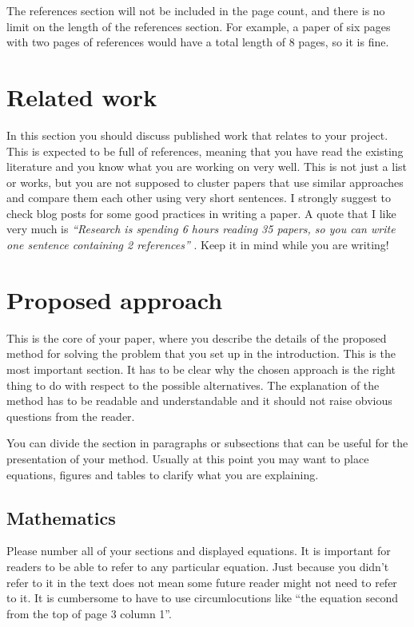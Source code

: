 \documentclass[10pt,twocolumn,letterpaper]{article}
\begin{document}
The references section will not be included in the page count, and there is no limit on the length of the references section. For example, a paper of six pages with two pages of references would have a total length of 8 pages, so it is fine.


\section{Related work}
In this section you should discuss published work that relates to your project. This is expected to be full of references, meaning that you have read the existing literature and you know what you are working on very well. This is not just a list or works, but you are not supposed to cluster papers that use similar approaches and compare them each other using very short sentences. I strongly suggest to check \cite{steinhardt, lipton} blog posts for some good practices in writing a paper. A quote that I like very much is \emph{``Research is spending 6 hours reading 35 papers, so you can write one sentence containing 2 references''} \cite{twit:ref}. Keep it in mind while you are writing!
\section{Proposed approach}
This is the core of your paper, where you describe the details of the proposed method for solving the problem that you set up in the introduction. This is the most important section. It has to be clear why the chosen approach is the right thing to do with respect to the possible alternatives. The explanation of the method has to be readable and understandable and it should not raise obvious questions from the reader. 

You can divide the section in paragraphs or subsections that can be useful for the presentation of your method. Usually at this point you may want to place equations, figures and tables to clarify what you are explaining.
\subsection{Mathematics}
Please number all of your sections and displayed equations.  It is
important for readers to be able to refer to any particular equation.  Just
because you didn't refer to it in the text does not mean some future reader
might not need to refer to it.  It is cumbersome to have to use
circumlocutions like ``the equation second from the top of page 3 column
1''. 
\end{document}
